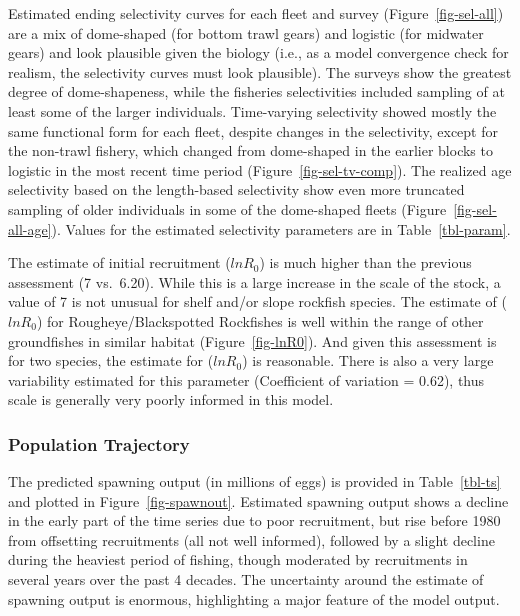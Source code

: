 \documentclass[
]{scrartcl}
\begin{document}
Estimated ending selectivity curves for each fleet and survey
(Figure~\ref{fig-sel-all}) are a mix of dome-shaped (for bottom trawl
gears) and logistic (for midwater gears) and look plausible given the
biology (i.e., as a model convergence check for realism, the selectivity
curves must look plausible). The surveys show the greatest degree of
dome-shapeness, while the fisheries selectivities included sampling of
at least some of the larger individuals. Time-varying selectivity showed
mostly the same functional form for each fleet, despite changes in the
selectivity, except for the non-trawl fishery, which changed from
dome-shaped in the earlier blocks to logistic in the most recent time
period (Figure~\ref{fig-sel-tv-comp}). The realized age selectivity
based on the length-based selectivity show even more truncated sampling
of older individuals in some of the dome-shaped fleets
(Figure~\ref{fig-sel-all-age}). Values for the estimated selectivity
parameters are in Table~\ref{tbl-param}.

The estimate of initial recruitment (\(lnR_0\)) is much higher than the
previous assessment (7 vs.~6.20). While this is a large increase in the
scale of the stock, a value of 7 is not unusual for shelf and/or slope
rockfish species. The estimate of (\(lnR_0\)) for Rougheye/Blackspotted
Rockfishes is well within the range of other groundfishes in similar
habitat (Figure~\ref{fig-lnR0}). And given this assessment is for two
species, the estimate for (\(lnR_0\)) is reasonable. There is also a
very large variability estimated for this parameter (Coefficient of
variation = 0.62), thus scale is generally very poorly informed in this
model.

\subsubsection{Population Trajectory}\label{population-trajectory}

The predicted spawning output (in millions of eggs) is provided in
Table~\ref{tbl-ts} and plotted in Figure~\ref{fig-spawnout}. Estimated
spawning output shows a decline in the early part of the time series due
to poor recruitment, but rise before 1980 from offsetting recruitments
(all not well informed), followed by a slight decline during the
heaviest period of fishing, though moderated by recruitments in several
years over the past 4 decades. The uncertainty around the estimate of
spawning output is enormous, highlighting a major feature of the model
output.
\end{document}
